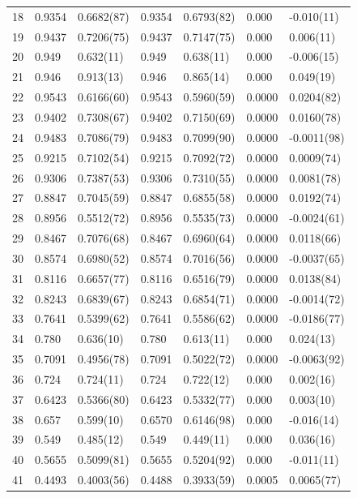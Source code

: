 \documentclass[aps, prc, tightenlines,superscriptaddress, letterpaper, amsmath, amssymb, preprintnumbers, floatfix, longbibliography, nofootinbib]{revtex4-2}
\begin{document}
\begin{table}[!htb]
{\begin{tabularx}{\textwidth}{| c || Y | Y | Y | Y | Y | Y |}
18	&	0.9354	&	0.6682(87)	&	0.9354	&	0.6793(82)	&	0.000	&	-0.010(11)	\\
19	&	0.9437	&	0.7206(75)	&	0.9437	&	0.7147(75)	&	0.000	&	0.006(11)	\\
20	&	0.949	&	0.632(11)	&	0.949	&	0.638(11)	&	0.000	&	-0.006(15)	\\
21	&	0.946	&	0.913(13)	&	0.946	&	0.865(14)	&	0.000	&	0.049(19)	\\
22	&	0.9543	&	0.6166(60)	&	0.9543	&	0.5960(59)	&	0.0000	&	0.0204(82)	\\
23	&	0.9402	&	0.7308(67)	&	0.9402	&	0.7150(69)	&	0.0000	&	0.0160(78)	\\
24	&	0.9483	&	0.7086(79)	&	0.9483	&	0.7099(90)	&	0.0000	&	-0.0011(98)	\\
25	&	0.9215	&	0.7102(54)	&	0.9215	&	0.7092(72)	&	0.0000	&	0.0009(74)	\\
26	&	0.9306	&	0.7387(53)	&	0.9306	&	0.7310(55)	&	0.0000	&	0.0081(78)	\\
27	&	0.8847	&	0.7045(59)	&	0.8847	&	0.6855(58)	&	0.0000	&	0.0192(74)	\\
28	&	0.8956	&	0.5512(72)	&	0.8956	&	0.5535(73)	&	0.0000	&	-0.0024(61)	\\
29	&	0.8467	&	0.7076(68)	&	0.8467	&	0.6960(64)	&	0.0000	&	0.0118(66)	\\
30	&	0.8574	&	0.6980(52)	&	0.8574	&	0.7016(56)	&	0.0000	&	-0.0037(65)	\\
31	&	0.8116	&	0.6657(77)	&	0.8116	&	0.6516(79)	&	0.0000	&	0.0138(84)	\\
32	&	0.8243	&	0.6839(67)	&	0.8243	&	0.6854(71)	&	0.0000	&	-0.0014(72)	\\
33	&	0.7641	&	0.5399(62)	&	0.7641	&	0.5586(62)	&	0.0000	&	-0.0186(77)	\\
34	&	0.780	&	0.636(10)	&	0.780	&	0.613(11)	&	0.000	&	0.024(13)	\\
35	&	0.7091	&	0.4956(78)	&	0.7091	&	0.5022(72)	&	0.0000	&	-0.0063(92)	\\
36	&	0.724	&	0.724(11)	&	0.724	&	0.722(12)	&	0.000	&	0.002(16)	\\
37	&	0.6423	&	0.5366(80)	&	0.6423	&	0.5332(77)	&	0.000	&	0.003(10)	\\
38	&	0.657	&	0.599(10)	&	0.6570	&	0.6146(98)	&	0.000	&	-0.016(14)	\\
39	&	0.549	&	0.485(12)	&	0.549	&	0.449(11)	&	0.000	&	0.036(16)	\\
40	&	0.5655	&	0.5099(81)	&	0.5655	&	0.5204(92)	&	0.000	&	-0.011(11)	\\
41	&	0.4493	&	0.4003(56)	&	0.4488	&	0.3933(59)	&	0.0005	&	0.0065(77)	\\

\end{tabularx}}
\end{table}
\end{document}
